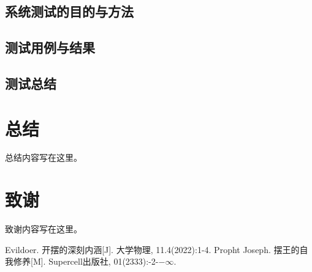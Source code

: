 \documentclass[12pt,a4paper]{article}%
\begin{document}
\subsection{系统测试的目的与方法}
\subsection{测试用例与结果}
\subsection{测试总结}

\section*{总结}%
总结内容写在这里。

\section*{致谢}
致谢内容写在这里。

%
%
\newpage
\begin{thebibliography}{99}%
	Evildoer. 开摆的深刻内涵[J]. 大学物理, 11.4(2022):1-4.
	Propht Joseph. 摆王的自我修养[M]. Supercell出版社, 01(2333):-2-$-\infty$.
\end{thebibliography}
\end{document}
